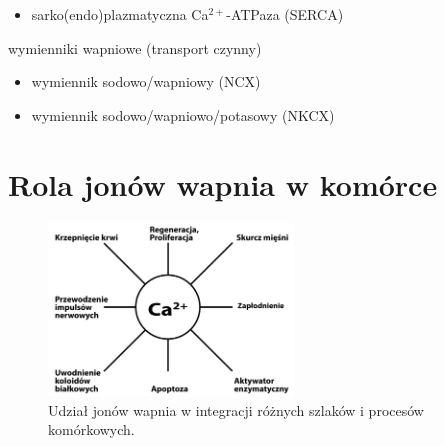 \begin{bulletList}
\begin{itemize}[label=\textopenbullet]
	\item sarko(endo)plazmatyczna Ca$^{2+}$-ATPaza (SERCA)
	\end{itemize}
\item wymienniki wapniowe (transport czynny)
	\begin{itemize}[label=\textopenbullet]
	\item wymiennik sodowo/wapniowy (NCX)
	\item wymiennik sodowo/wapniowo/potasowy (NKCX)
	\end{itemize}
\end{bulletList}



\section{Rola jonów wapnia w komórce}
\label{sec:rolaCa}

\begin{figure}
  \includegraphics[width=0.58\textwidth]{rysunki/rozdzial_1/funkcjeCa.png}
 \caption[Udział jonów Ca$^{2+}$ w integracji szlaków sygnałowych]{Udział jonów wapnia w integracji różnych szlaków i procesów komórkowych.}
 \label{fig:integracja}
\end{figure}

